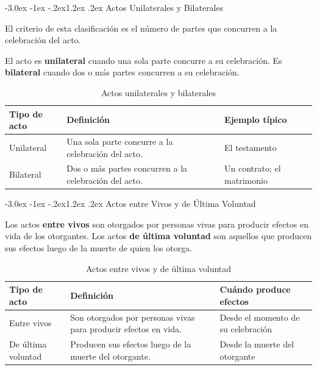 \documentclass[12pt,oneside]{book}
\makeatletter
\renewcommand\section{\@startsection{section}{1}{\z@}%
  {-3.0ex \@plus -1ex \@minus -.2ex}{1.2ex \@plus .2ex}%
  {\normalfont\large\bfseries\color{acento}}}
\makeatother
\begin{document}
\section{Actos Unilaterales y Bilaterales}

El criterio de esta clasificación es el número de partes que concurren a la celebración del acto.

\begin{definicion}
El acto es \textbf{unilateral} cuando una sola parte concurre a su celebración. Es \textbf{bilateral} cuando dos o más partes concurren a su celebración.
\end{definicion}

\begin{table}[H]
\centering
\begin{tabularx}{\textwidth}{l X l}
\toprule
\textbf{Tipo de acto} & \textbf{Definición} & \textbf{Ejemplo típico} \\
\midrule
Unilateral & Una sola parte concurre a la celebración del acto. & El testamento \\
Bilateral & Dos o más partes concurren a la celebración del acto. & Un contrato; el matrimonio \\
\bottomrule
\end{tabularx}
\caption{Actos unilaterales y bilaterales}
\end{table}

\section{Actos entre Vivos y de Última Voluntad}

\begin{definicion}
Los actos \textbf{entre vivos} son otorgados por personas vivas para producir efectos en vida de los otorgantes. Los actos \textbf{de última voluntad} son aquellos que producen sus efectos luego de la muerte de quien los otorga.
\end{definicion}

\begin{table}[H]
\centering
\begin{tabularx}{\textwidth}{l X X}
\toprule
\textbf{Tipo de acto} & \textbf{Definición} & \textbf{Cuándo produce efectos} \\
\midrule
Entre vivos & Son otorgados por personas vivas para producir efectos en vida. & Desde el momento de su celebración \\
De última voluntad & Producen sus efectos luego de la muerte del otorgante. & Desde la muerte del otorgante \\
\bottomrule
\end{tabularx}
\caption{Actos entre vivos y de última voluntad}
\end{table}
\end{document}

